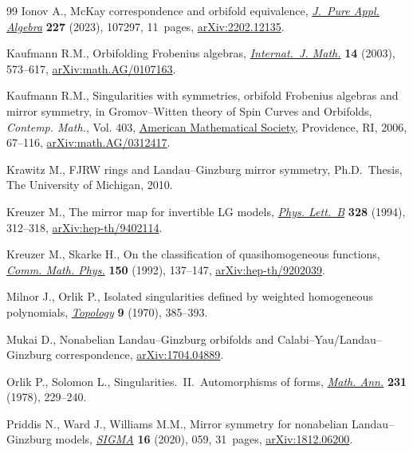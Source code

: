\begin{thebibliography}{99}
Ionov A., Mc{K}ay correspondence and orbifold equivalence, \href{https://doi.org/10.1016/j.jpaa.2022.107297}{\textit{J.~Pure
 Appl. Algebra}} \textbf{227} (2023), 107297, 11~pages, \href{https://arxiv.org/abs/2202.12135}{arXiv:2202.12135}.

Kaufmann R.M., Orbifolding {F}robenius algebras, \href{https://doi.org/10.1142/S0129167X03001831}{\textit{Internat.~J. Math.}}
 \textbf{14} (2003), 573--617, \href{https://arxiv.org/abs/math.AG/0107163}{arXiv:math.AG/0107163}.

Kaufmann R.M., Singularities with symmetries, orbifold {F}robenius algebras and
 mirror symmetry, in Gro\-mov--{W}itten theory of {S}pin {C}urves and
 {O}rbifolds, \textit{Contemp. Math.}, Vol. 403, \href{https://doi.org/10.1090/conm/403/07596}{American Mathematical
 Society}, Providence, RI, 2006, 67--116, \href{https://arxiv.org/abs/math.AG/0312417}{arXiv:math.AG/0312417}.

Krawitz M., F{JRW} rings and {L}andau--{G}inzburg mirror symmetry, Ph.D.~Thesis, {T}he {U}niversity of {M}ichigan, 2010.

Kreuzer M., The mirror map for invertible {LG} models, \href{https://doi.org/10.1016/0370-2693(94)91485-0}{\textit{Phys. Lett.~B}}
 \textbf{328} (1994), 312--318, \href{https://arxiv.org/abs/hep-th/9402114}{arXiv:hep-th/9402114}.

Kreuzer M., Skarke H., On the classification of quasihomogeneous functions,
 \href{https://doi.org/10.1007/BF02096569}{\textit{Comm. Math. Phys.}} \textbf{150} (1992), 137--147,
 \href{https://arxiv.org/abs/hep-th/9202039}{arXiv:hep-th/9202039}.

Milnor J., Orlik P., Isolated singularities defined by weighted homogeneous
 polynomials, \href{https://doi.org/10.1016/0040-9383(70)90061-3}{\textit{Topology}} \textbf{9} (1970), 385--393.

Mukai D., Nonabelian {L}andau--{G}inzburg orbifolds and
 {C}alabi--{Y}au/{L}andau--{G}inzburg correspondence, \href{https://arxiv.org/abs/1704.04889}{arXiv:1704.04889}.

Orlik P., Solomon L., Singularities.~{II}.~{A}utomorphisms of forms,
 \href{https://doi.org/10.1007/BF01420243}{\textit{Math. Ann.}} \textbf{231} (1978), 229--240.

Priddis N., Ward J., Williams M.M., Mirror symmetry for nonabelian
 {L}andau--{G}inzburg models, \href{https://doi.org/10.3842/SIGMA.2020.059}{\textit{SIGMA}} \textbf{16} (2020), 059,
 31~pages, \href{https://arxiv.org/abs/1812.06200}{arXiv:1812.06200}.


\end{thebibliography}

